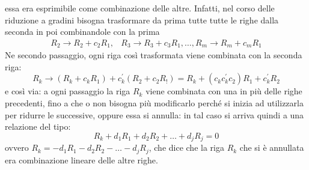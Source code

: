\begin{defi}
  essa era esprimibile come combinazione delle altre. Infatti, nel corso
  delle riduzione a gradini bisogna trasformare da prima tutte tutte le
  righe dalla seconda in poi combinandole con la prima
  \begin{equation*}
    \begin{matrix}
      R_2\to R_2+c_2R_1, & R_3\to R_3+c_3R_1,\dots,R_m \to R_m+c_mR_1
    \end{matrix}
  \end{equation*}
  Ne secondo passaggio, ogni riga così trasformata viene combinata con la
  seconda riga:
  \begin{equation*}
    R_k\to (R_k+c_kR_1)+c_k^\prime(R_2+c_2R_!)=R_k+(c_kc^\prime_kc_2)R_1
    +c_k^\prime R_2
  \end{equation*}
  e così via: a ogni passaggio la riga $R_k$ viene combinata con una in
  più delle righe precedenti, fino a che o non bisogna più modificarlo
  perché si inizia ad utilizzarla per ridurre le successive, oppure essa
  si annulla: in tal caso si arriva quindi a una relazione del tipo:
  \begin{equation*}
    R_k+d_1R_1+d_2R_2+\dots+d_jR_j=0
  \end{equation*}
  ovvero $R_k=-d_1R_1-d_2R_2-\dots-d_jR_j$, che dice che la riga $R_k$ che
  si è annullata era combinazione lineare delle altre righe.
\end{defi}
